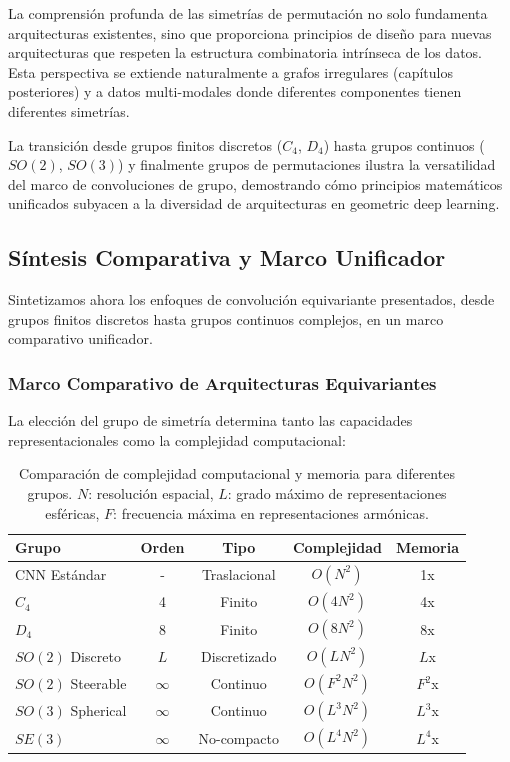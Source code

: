 La comprensión profunda de las simetrías de permutación no solo fundamenta arquitecturas existentes, sino que proporciona principios de diseño para nuevas arquitecturas que respeten la estructura combinatoria intrínseca de los datos. Esta perspectiva se extiende naturalmente a grafos irregulares (capítulos posteriores) y a datos multi-modales donde diferentes componentes tienen diferentes simetrías.

La transición desde grupos finitos discretos ($C_4$, $D_4$) hasta grupos continuos ($SO(2)$, $SO(3)$) y finalmente grupos de permutaciones ilustra la versatilidad del marco de convoluciones de grupo, demostrando cómo principios matemáticos unificados subyacen a la diversidad de arquitecturas en geometric deep learning.

\subsection{Síntesis Comparativa y Marco Unificador}\label{subsec:sintesis_comparativa_gcnn}

Sintetizamos ahora los enfoques de convolución equivariante presentados, desde grupos finitos discretos hasta grupos continuos complejos, en un marco comparativo unificador.

\subsubsection{Marco Comparativo de Arquitecturas Equivariantes}\label{subsubsec:marco_comparativo_arquitecturas}

La elección del grupo de simetría determina tanto las capacidades representacionales como la complejidad computacional:

\begin{table}[h]
\centering
\small
\begin{tabular}{|l|c|c|c|c|}
\hline
\textbf{Grupo} & \textbf{Orden} & \textbf{Tipo} & \textbf{Complejidad} & \textbf{Memoria} \\
\hline
CNN Estándar & - & Traslacional & $O(N^2)$ & 1x \\
$C_4$ & 4 & Finito & $O(4N^2)$ & 4x \\
$D_4$ & 8 & Finito & $O(8N^2)$ & 8x \\
$SO(2)$ Discreto & $L$ & Discretizado & $O(LN^2)$ & $L$x \\
$SO(2)$ Steerable & $\infty$ & Continuo & $O(F^2N^2)$ & $F^2$x \\
$SO(3)$ Spherical & $\infty$ & Continuo & $O(L^3N^2)$ & $L^3$x \\
$SE(3)$ & $\infty$ & No-compacto & $O(L^4N^2)$ & $L^4$x \\
\hline
\end{tabular}
\caption{Comparación de complejidad computacional y memoria para diferentes grupos. $N$: resolución espacial, $L$: grado máximo de representaciones esféricas, $F$: frecuencia máxima en representaciones armónicas.}
\label{tab:group_complexity_comparison}
\end{table}

